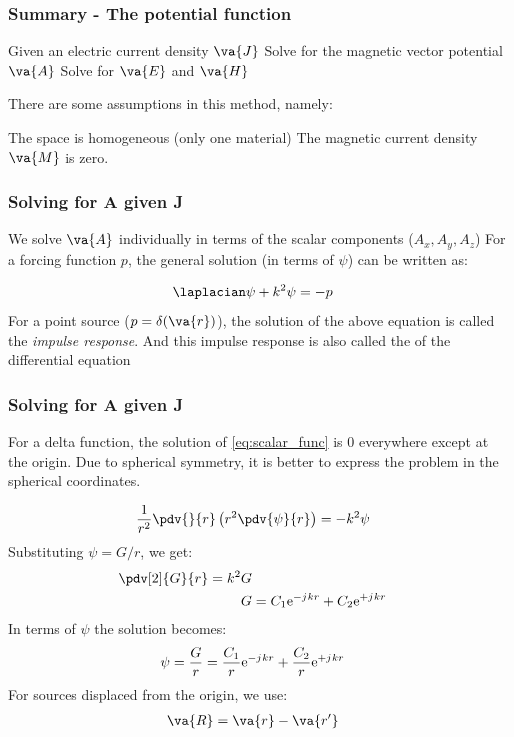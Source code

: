 \documentclass[10pt, compress]{beamer}
\newcommand{\e}{\mathrm{e}} %
\renewcommand{\j}{{j}\mkern1mu} %
\begin{document}
\begin{frame}
  \frametitle{Summary - The potential function}
  \begin{outline}
    \1 Given an electric current density $\va{J}$
    \1 Solve for the magnetic vector potential $\va{A}$
    \2 Solve for $\va{E}$ and $\va{H}$
  \end{outline}
  There are some assumptions in this method, namely:
  \begin{outline}
    \1 The space is homogeneous (only one material)
    \1 The magnetic current density $\va{M}$ is zero.
  \end{outline}
\end{frame}


\begin{frame}
  \frametitle{Solving for A given J}
  \begin{outline}
    \1 We solve $\va{A}$ individually in terms of the scalar components ($A_x, A_y, A_z$)
    \1 For a forcing function $p$, the general solution (in terms of $\psi$) can be written as:
  \end{outline}
  \begin{align}
    \laplacian \psi + k^2 \psi & = -p
    \label{eq:scalar_func}
  \end{align}
  For a point source ($p = \delta(\va{r})$), the solution of the above equation is called the \textit{impulse response}. And this impulse response is also called the \color{red}{Green function} of the differential equation
\end{frame}



\begin{frame}
  \frametitle{Solving for A given J}
  \begin{outline}
    \1 For a delta function, the solution of \ref{eq:scalar_func} is 0 everywhere except at the origin.
    \1 Due to spherical symmetry, it is better to express the problem in the spherical coordinates.
  \end{outline}
  \begin{align*}
    \frac{1}{r^2}\pdv{}{r}\left(r^2 \pdv{\psi}{r}\right) & = -k^2 \psi
  \end{align*}
  Substituting $\psi = G/r$, we get:
  \begin{align*}
    \pdv[2]{G}{r} = k^2 G                     \\
    G & = C_1 \e^{-\j k r} + C_2 \e^{+\j k r}
  \end{align*}
  In terms of $\psi$ the solution becomes:
  \begin{align*}
    \psi = \frac{G}{r} & = \frac{C_1}{r} \e^{-\j k r} + \frac{C_2}{r} \e^{+\j k r}
  \end{align*}
  For sources displaced from the origin, we use:
  \begin{align*}
    \va{R} & = \va{r} - \va{r'}
  \end{align*}
\end{frame}
\end{document}
